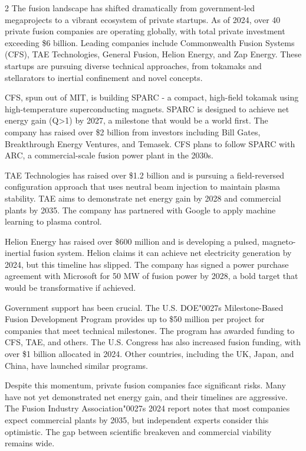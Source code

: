 \documentclass[10pt,a4paper]{article}
\newcommand{\BOApos}{{\BOQuoteFont\char"0027}}
\begin{document}
\begin{multicols}{2}
{\small The fusion landscape has shifted dramatically from government-led megaprojects to a vibrant ecosystem of private startups. As of 2024, over 40 private fusion companies are operating globally, with total private investment exceeding \$6 billion. Leading companies include Commonwealth Fusion Systems (CFS), TAE Technologies, General Fusion, Helion Energy, and Zap Energy. These startups are pursuing diverse technical approaches, from tokamaks and stellarators to inertial confinement and novel concepts.}\par
{\small CFS, spun out of MIT, is building SPARC - a compact, high-field tokamak using high-temperature superconducting magnets. SPARC is designed to achieve net energy gain (Q>1) by 2027, a milestone that would be a world first. The company has raised over \$2 billion from investors including Bill Gates, Breakthrough Energy Ventures, and Temasek. CFS plans to follow SPARC with ARC, a commercial-scale fusion power plant in the 2030s.}\par
{\small TAE Technologies has raised over \$1.2 billion and is pursuing a field-reversed configuration approach that uses neutral beam injection to maintain plasma stability. TAE aims to demonstrate net energy gain by 2028 and commercial plants by 2035. The company has partnered with Google to apply machine learning to plasma control.}\par
{\small Helion Energy has raised over \$600 million and is developing a pulsed, magneto-inertial fusion system. Helion claims it can achieve net electricity generation by 2024, but this timeline has slipped. The company has signed a power purchase agreement with Microsoft for 50 MW of fusion power by 2028, a bold target that would be transformative if achieved.}\par
{\small Government support has been crucial. The U.S. DOE\BOApos{}s Milestone-Based Fusion Development Program provides up to \$50 million per project for companies that meet technical milestones. The program has awarded funding to CFS, TAE, and others. The U.S. Congress has also increased fusion funding, with over \$1 billion allocated in 2024. Other countries, including the UK, Japan, and China, have launched similar programs.}\par
{\small Despite this momentum, private fusion companies face significant risks. Many have not yet demonstrated net energy gain, and their timelines are aggressive. The Fusion Industry Association\BOApos{}s 2024 report notes that most companies expect commercial plants by 2035, but independent experts consider this optimistic. The gap between scientific breakeven and commercial viability remains wide.}\par
\end{multicols}
\label{chap:2:end}
\end{document}
